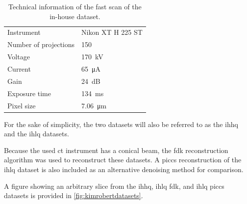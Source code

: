 \begin{table}[htbp]
    \centering
    \caption[Technical information of the IHLQ soda lime glass spheres dataset]{Technical information of the fast scan of the in-house dataset. }
    \label{tab:inhouselq}
    \begin{tabular}{ll}
    \hline
    Instrument & Nikon XT H 225 ST \\
    Number of projections & 150 \\
    Voltage & \SI{170}{\kilo \volt}\\
    Current & \SI{65}{\micro \ampere}\\
    Gain & \SI{24}{\deci \bel}\\
    Exposure time & \SI{134}{\milli \second}\\
    Pixel size & \SI{7.06}{\micro \meter} \\
    \hline
    \end{tabular}
\end{table}

For the sake of simplicity, the two datasets will also be referred to as the \gls{ihhq} and the \gls{ihlq} datasets. 

Because the used \gls{ct} instrument has a conical beam, the \gls{fdk} reconstruction algorithm was used to reconstruct these datasets. A \gls{piccs} reconstruction of the \gls{ihlq} dataset is also included as an alternative denoising method for comparison. 

A figure showing an arbitrary slice from the \gls{ihhq}, \gls{ihlq} \gls{fdk}, and \gls{ihlq} \gls{piccs} datasets is provided in \cref{fig:kimrobertdatasets}.

